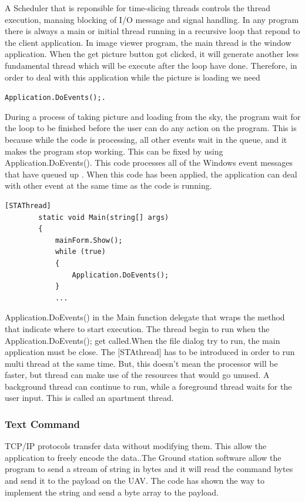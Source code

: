A Scheduler that is reponsible for time-slicing threads controls the thread execution, manaing blocking of I/O message and signal handling\cite{keithC}. In any program there is always a main or initial thread running in a recursive loop that repond to the client application. In image viewer program, the main thread is the window application. When the get picture button got clicked, it will generate another less fundamental thread which will be execute after the loop have done. Therefore, in order to deal with this application while the picture is loading we need

\begin{center}
\texttt{Application.DoEvents();.}
\end{center}

During a process of taking picture and loading from the sky, the program wait for the loop to be finished before the user can do any action on the program. This is because while the code is processing, all other events wait in the queue, and it makes the program stop working. This can be fixed by using Application.DoEvents(). This code processes all of the Windows event messages that have queued up \cite{davidW}. When this code has been applied, the application can deal with other event at the same time as the code is running.


\begin{lstlisting}[caption={thread handling in the main},label=lst:threadH]
        [STAThread]        
        static void Main(string[] args)        
        {        
            mainForm.Show();
            while (true)            
            {            
                Application.DoEvents();                
            }
        	...
        \end{lstlisting}
        Application.DoEvents() in the Main function delegate that wraps the method that indicate where to start execution. The thread begin to run when the Application.DoEvents(); get called\cite{xieX}.When the file dialog try to run, the main application must be close. The [STAthread] has to be introduced in order to run multi thread at the same time. But, this doesn't mean the processor will be faster, but thread can make use of the resources that would go unused. A background thread can continue to run, while a foreground thread waits for the user input. This is called an apartment thread. 
        
\subsubsection*{Text Command}
TCP/IP protocols transfer data without modifying them. This allow the application to freely encode the data.\cite{davidB}.The Ground station software allow the program to send a stream of string in bytes and it will read the command bytes and send it to the payload on the UAV. The code has shown the way to implement the string and send a byte array to the payload.
	
